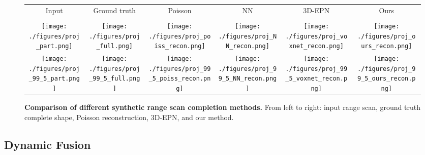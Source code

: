 \begin{figure*}
\centering
\addtolength{\tabcolsep}{-4pt}
\begin{tabular}{c@{\hskip 7mm}c@{\hskip 7mm}c@{\hskip 7mm}c@{\hskip 7mm}c@{\hskip 7mm}c}
Input & Ground truth & Poisson & NN & 3D-EPN & Ours \\ \\
\texttt{[image: ./figures/proj\_part.png]} &
\texttt{[image: ./figures/proj\_full.png]} &
\texttt{[image: ./figures/proj\_poiss\_recon.png]} &
\texttt{[image: ./figures/proj\_NN\_recon.png]} &
\texttt{[image: ./figures/proj\_voxnet\_recon.png]} &
\texttt{[image: ./figures/proj\_ours\_recon.png]} \\ 
\texttt{[image: ./figures/proj\_99\_5\_part.png]} &
\texttt{[image: ./figures/proj\_99\_5\_full.png]} &
\texttt{[image: ./figures/proj\_99\_5\_poiss\_recon.png]} &
\texttt{[image: ./figures/proj\_99\_5\_NN\_recon.png]} &
\texttt{[image: ./figures/proj\_99\_5\_voxnet\_recon.png]} &
\texttt{[image: ./figures/proj\_99\_5\_ours\_recon.png]}
\end{tabular}
\caption{\textbf{Comparison of different synthetic range scan completion methods.} From left to right: input range scan, ground truth complete shape, Poisson reconstruction, 3D-EPN, and our method. 
} 
\label{fig:proj_completion}
\end{figure*} 


\subsection{Dynamic Fusion}
\label{subsec:dynamic_fusion}

